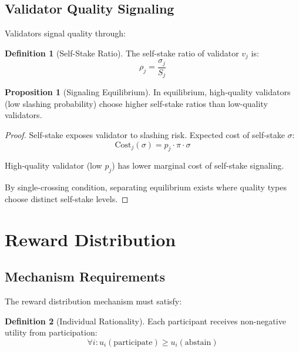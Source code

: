\documentclass[11pt,a4paper]{article}
\theoremstyle{definition}
\newtheorem{definition}{Definition}[section]
\newtheorem{proposition}[theorem]{Proposition}
\theoremstyle{remark}
\begin{document}
\subsection{Validator Quality Signaling}

Validators signal quality through:

\begin{definition}[Self-Stake Ratio]
The self-stake ratio of validator $v_j$ is:
\begin{equation}
    \rho_j = \frac{\sigma_j}{S_j}
\end{equation}
\end{definition}

\begin{proposition}[Signaling Equilibrium]
In equilibrium, high-quality validators (low slashing probability) choose higher self-stake ratios than low-quality validators.
\end{proposition}

\begin{proof}
Self-stake exposes validator to slashing risk. Expected cost of self-stake $\sigma$:
\begin{equation}
    \text{Cost}_j(\sigma) = p_j \cdot \pi \cdot \sigma
\end{equation}

High-quality validator (low $p_j$) has lower marginal cost of self-stake signaling.

By single-crossing condition, separating equilibrium exists where quality types choose distinct self-stake levels.
\end{proof}

\section{Reward Distribution}

\subsection{Mechanism Requirements}

The reward distribution mechanism must satisfy:

\begin{definition}[Individual Rationality]
Each participant receives non-negative utility from participation:
\begin{equation}
    \forall i: u_i(\text{participate}) \geq u_i(\text{abstain})
\end{equation}
\end{definition}
\end{document}
